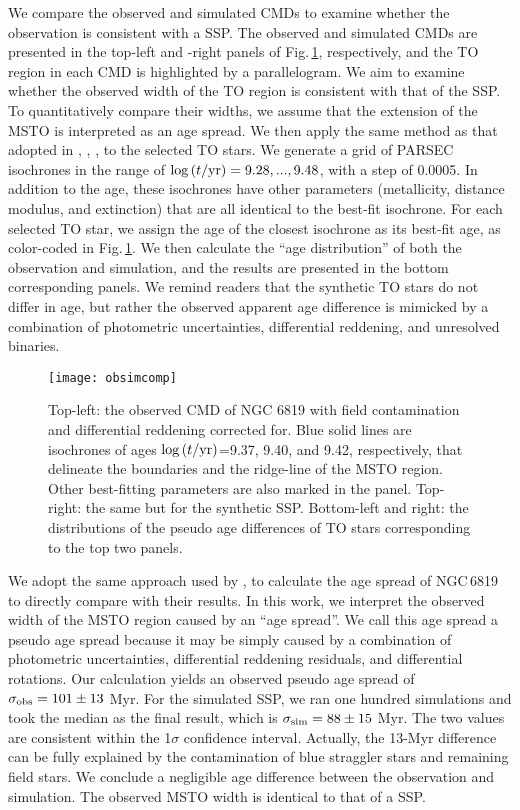 \documentclass[twocolumn]{aastex631}
\begin{document}
We compare the observed and simulated CMDs to examine whether the observation is consistent with a SSP. The observed and simulated CMDs are presented in the top-left and -right panels of Fig.\,\ref{fig:obsimcomp}, respectively, and the TO region in each CMD is highlighted by a parallelogram. We aim to examine whether the observed width of the TO region is consistent with that of the SSP. To quantitatively compare their widths, we assume that the extension of the MSTO is interpreted as an age spread. We then apply the same method as that adopted in \citet{li2014not}, \citet{Bastian2016A}, \citet{bastian2018extended}, \citet{cordoni2018extended} to the selected TO stars. We generate a grid of PARSEC isochrones in the range of $\log{(t/{\rm yr})}=9.28,...,9.48$, with a step of 0.0005. In addition to the age, these isochrones have other parameters (metallicity, distance modulus, and extinction) that are all identical to the best-fit isochrone. For each selected TO star, we assign the age of the closest isochrone as its best-fit age, as color-coded in Fig.\,\ref{fig:obsimcomp}. We then calculate the ``age distribution'' of both the observation and simulation, and the results are presented in the bottom corresponding panels. We remind readers that the synthetic TO stars do not differ in age, but rather the observed apparent age difference is mimicked by a combination of photometric uncertainties, differential reddening, and unresolved binaries. 
\begin{figure*}
	\centering
	\texttt{[image: obsimcomp]}
	\caption{Top-left: the observed CMD of NGC 6819 with field contamination and differential reddening corrected for. Blue solid lines are isochrones of ages $\log{(t/{\rm yr})}$=9.37, 9.40, and 9.42, respectively, that delineate the boundaries and the ridge-line of the MSTO region. Other best-fitting parameters are also marked in the panel. Top-right: the same but for the synthetic SSP. Bottom-left and right: the distributions of the pseudo age differences of TO stars corresponding to the top two panels.}
	\label{fig:obsimcomp}
\end{figure*}

We adopt the same approach used by \citet{milone2015multiple}, \cite{cordoni2018extended} to calculate the age spread of NGC\,6819 to directly compare with their results. In this work, we interpret the observed width of the MSTO region caused by an ``age spread''. We call this age spread a pseudo age spread because it may be simply caused by a combination of photometric uncertainties, differential reddening residuals, and differential rotations.  Our calculation yields an observed pseudo age spread of $\sigma_{\rm obs} = 101\pm13$ Myr. For the simulated SSP, we ran one hundred simulations and took the median as the final result, which is $\sigma_{\rm sim}=88\pm15$ Myr. The two values are consistent within the 1$\sigma$ confidence interval. Actually, the 13-Myr difference can be fully explained by the contamination of blue straggler stars and remaining field stars. We conclude a negligible age difference between the observation and simulation. The observed MSTO width is identical to that of a SSP.  
\end{document}

